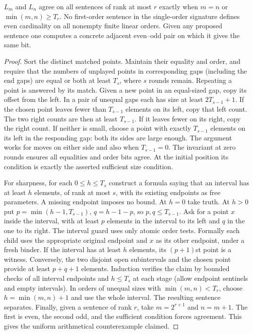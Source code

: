 \begin{theorem}\label{thm:orders}
$L_m$ and $L_n$ agree on all sentences of rank at most $r$ exactly when $m=n$ or $\min(m,n)\ge T_r$. No first-order sentence in the single-order signature defines even cardinality on all nonempty finite linear orders. Given any proposed sentence one computes a concrete adjacent even--odd pair on which it gives the same bit.
\end{theorem}
\begin{proof}
Sort the distinct matched points. Maintain their equality and order, and require that the numbers of unplayed points in corresponding gaps (including the end gaps) are equal or both at least $T_s$, where $s$ rounds remain. Repeating a point is answered by its match. Given a new point in an equal-sized gap, copy its offset from the left. In a pair of unequal gaps each has size at least $2T_{s-1}+1$. If the chosen point leaves fewer than $T_{s-1}$ elements on its left, copy that left count. The two right counts are then at least $T_{s-1}$. If it leaves fewer on its right, copy the right count. If neither is small, choose a point with exactly $T_{s-1}$ elements on its left in the responding gap: both its sides are large enough. The argument works for moves on either side and also when $T_{s-1}=0$. The invariant at zero rounds ensures all equalities and order bits agree. At the initial position its condition is exactly the asserted sufficient size condition.

For sharpness, for each $0\le h\le T_s$ construct a formula saying that an interval has at least $h$ elements, of rank at most $s$, with its existing endpoints as free parameters. A missing endpoint imposes no bound. At $h=0$ take truth. At $h>0$ put $p=\min(h-1,T_{s-1})$, $q=h-1-p$, so $p,q\le T_{s-1}$. Ask for a point $x$ inside the interval, with at least $p$ elements in the interval to its left and $q$ in the one to its right. The interval guard uses only atomic order tests. Formally each child uses the appropriate original endpoint and $x$ as its other endpoint, under a fresh binder. If the interval has at least $h$ elements, its $(p+1)$st point is a witness. Conversely, the two disjoint open subintervals and the chosen point provide at least $p+q+1$ elements. Induction verifies the claim by bounded checks of all interval endpoints and $h\le T_s$ at each stage (allow endpoint sentinels and empty intervals). In orders of unequal sizes with $\min(m,n)<T_r$, choose $h=\min(m,n)+1$ and use the whole interval. The resulting sentence separates. Finally, given a sentence of rank $r$, take $m=2^{r+1}$ and $n=m+1$. The first is even, the second odd, and the sufficient condition forces agreement. This gives the uniform arithmetical counterexample claimed.
\end{proof}

